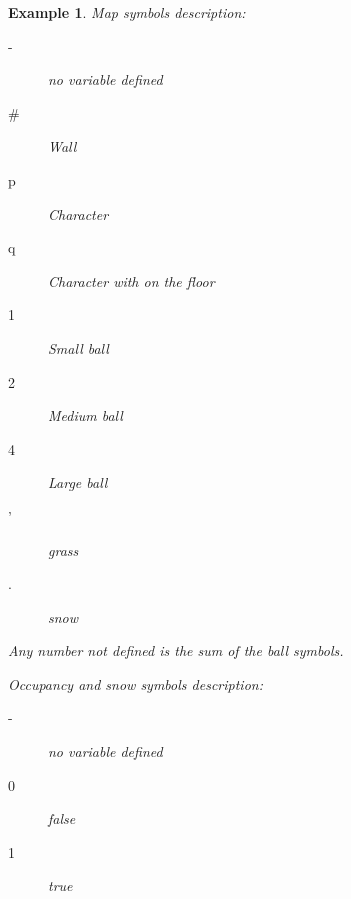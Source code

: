 \documentclass{report}
\theoremstyle{plain}
\newtheorem{example}{Example}[section]
\begin{document}
\begin{example}
\vspace{1\baselineskip}

Map symbols description:

\begin{minipage}{0.5\textwidth}
\begin{description}
    \item[-] no variable defined
    \item[\#] Wall
    \item[p] Character
    \item[q] Character with on the floor
    \item[1] Small ball
\end{description}
\end{minipage}
\begin{minipage}{0.5\textwidth}
\begin{description}
    \item[2] Medium ball
    \item[4] Large ball
    \item['] grass
    \item[.] snow
\end{description}
\end{minipage}

Any number not defined is the sum of the ball symbols.

\vspace{1\baselineskip}

Occupancy and snow symbols description:
\begin{description}
    \item[-] no variable defined
    \item[0] false
    \item[1] true
\end{description}
\end{example}

\vspace{1\baselineskip}

\newpage
\end{document}
